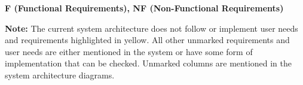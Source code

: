 \documentclass[11pt,a4paper]{article}
\begin{document}
\begin{table}[H]
\vspace{8pt} %

\textbf{F (Functional Requirements), NF (Non-Functional Requirements)}

\vspace{8pt} %

\textbf{Note:} The current system architecture does not follow or implement user needs and requirements highlighted in yellow. All other unmarked requirements and user needs are either mentioned in the system or have some form of implementation that can be checked. Unmarked columns are mentioned in the system architecture diagrams.
\end{table}


\end{document}
